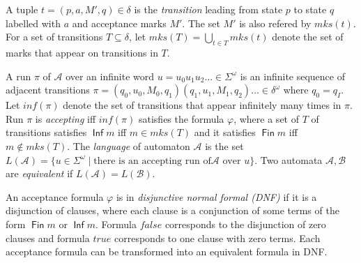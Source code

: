 \documentclass[a4paper,UKenglish,cleveref, autoref, thm-restate]{lipics-v2021}
\DeclareMathOperator{\Inf}{\mathsf{Inf}}
\DeclareMathOperator{\Fin}{\mathsf{Fin}}
\newcommand{\minf}{\mathit{inf}}
\newcommand{\mks}{\mathit{mks}}
\def\false{\mathit{false}}
\def\true{\mathit{true}}
\newcommand{\mA}{\mathcal{A}}
\newcommand{\mB}{\mathcal{B}}
\begin{document}
A tuple $t=(p,a,M',q)\in\delta$ is the \emph{transition} leading from
state $p$ to state $q$ labelled with $a$ and acceptance marks $M'$.
The set $M'$ is also refered by $\mks(t)$. For a set of transitions
$T\subseteq\delta$, let $\mks(T)=\bigcup_{t\in T}\mks(t)$ denote the
set of marks that appear on transitions in $T$.

A run $\pi$ of $\mA$ over an infinite word
$u = u_{0}u_{1}u_{2}\dots \in \Sigma^{\omega}$ is an infinite sequence
of adjacent transitions
$\pi=(q_0,u_0,M_0,q_1)(q_1,u_1,M_1,q_2)\dots\in\delta^{\omega}$ where
$q_0=q_I$. Let $\minf(\pi)$ denote the set of transitions that appear
infinitely many times in $\pi$. Run $\pi$ is \emph{accepting} iff
$\minf(\pi)$ satisfies the formula $\varphi$, where a set of $T$ of
transitions satisfies $\Inf m$ iff $m\in\mks(T)$ and it satisfies
$\Fin m$ iff $m\not\in\mks(T)$. The \emph{language} of automaton $\mA$ is
the set
$L(\mA)=\{u\in \Sigma^{\omega}\mid\textrm{there is an accepting run of
}\mA\textrm{ over }u\}$. Two automata $\mA,\mB$ are \emph{equivalent}
if $L(\mA)=L(\mB)$.

An acceptance formula $\varphi$ is in \emph{disjunctive normal formal
  (DNF)} if it is a disjunction of clauses, where each clause is a
conjunction of some terms of the form $\Fin m$ or $\Inf m$. Formula
$\false$ corresponds to the disjunction of zero clauses and formula
$\true$ corresponds to one clause with zero terms. Each acceptance
formula can be transformed into an equivalent formula in DNF.
\end{document}

